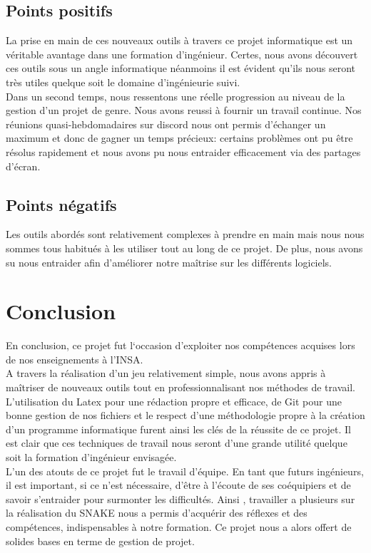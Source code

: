 \documentclass[11pt,a4paper]{article}
\begin{document}
        \subsection{Points positifs}
        La prise en main de ces nouveaux outils à travers ce projet informatique est un véritable avantage dans une formation d'ingénieur. Certes, nous avons découvert ces outils sous un angle informatique néanmoins il est évident qu'ils nous seront très utiles quelque soit le domaine d'ingénieurie suivi. \\
        Dans un second temps, nous ressentons une réelle progression au niveau de la gestion d'un projet de genre.
        Nous avons reussi à fournir un travail continue. Nos réunions quasi-hebdomadaires sur discord nous ont permis d'échanger un maximum et donc de gagner un temps précieux: certains problèmes ont pu être résolus rapidement et nous avons pu nous entraider efficacement via des partages d'écran.
        
        \subsection{Points négatifs}
        Les outils abordés sont relativement complexes à prendre en main mais nous nous sommes tous habitués à les utiliser tout au long de ce projet. De plus, nous avons su nous entraider afin d'améliorer notre maîtrise sur les différents logiciels. 
        
        \newpage

\section{Conclusion}

En conclusion, ce projet fut l‘occasion d'exploiter nos compétences acquises lors de nos enseignements à l’INSA.\\

	A travers la réalisation d’un jeu relativement simple, nous avons appris à maîtriser de nouveaux outils tout en professionnalisant nos méthodes de travail. L’utilisation du Latex pour une rédaction propre et efficace, de Git pour une bonne gestion de nos fichiers et le respect d’une méthodologie propre à la création d’un programme informatique furent ainsi les clés de la réussite de ce projet. Il est clair que ces techniques de travail nous seront d’une grande utilité quelque soit la formation d’ingénieur envisagée.\\

	L’un des atouts de ce projet fut le travail d’équipe. En tant que futurs ingénieurs, il est important, si ce n’est nécessaire, d’être à l’écoute de ses coéquipiers et de savoir s’entraider pour surmonter les difficultés. Ainsi , travailler a plusieurs sur la réalisation du SNAKE nous a permis  d’acquérir des réflexes et des compétences, indispensables à notre formation. Ce projet nous a alors offert de solides bases  en terme de gestion de projet.\\
\end{document}
